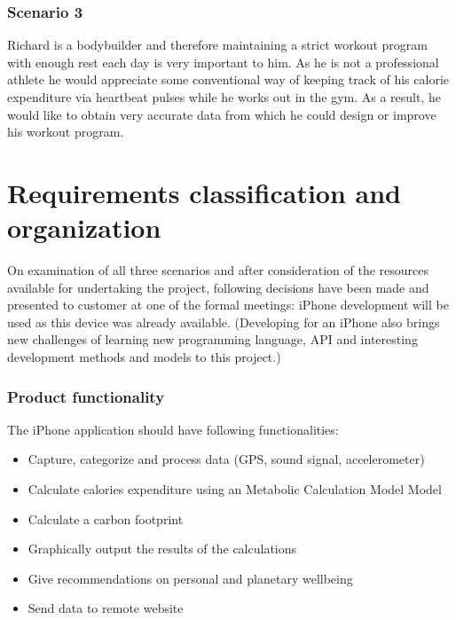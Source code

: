 \documentclass[12pt, a4paper]{report}   %
\begin{document}
\begin{enumerate}
\subsubsection*{Scenario 3}
Richard is a bodybuilder and therefore maintaining a strict workout program with enough rest each day is very important to him. As he is not a professional athlete he would appreciate some conventional way of keeping track of his calorie expenditure via heartbeat pulses while he works out in the gym. As a result, he would like to obtain very accurate data from which he could design or improve his workout program.

\section{Requirements classification and \\ organization}
On examination of all three scenarios and after consideration of the resources available for undertaking the project, following decisions have been made and presented to customer at one of the formal meetings: iPhone development will be used as this device was already available. (Developing for an iPhone also brings new challenges of learning new programming language, API and interesting development methods and models to this project.)

\subsubsection*{Product functionality}

The iPhone application should have following functionalities:

	\begin{itemize}
	\item Capture, categorize and process data (GPS, sound signal, accelerometer)
	\item Calculate calories expenditure using an Metabolic Calculation Model Model
	\item Calculate a carbon footprint
	\item Graphically output the results of the calculations
	\item Give recommendations on personal and planetary wellbeing
	\item Send data to remote website
	\end{itemize}


\end{enumerate}
\end{document}
